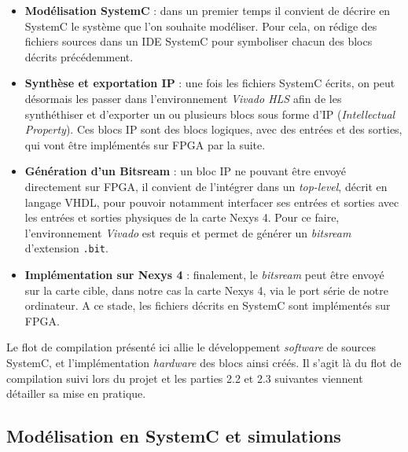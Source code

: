 \documentclass[a4paper,12pt]{article}
\begin{document}
	\begin{itemize}
		\item[\textbullet] \textbf{Modélisation SystemC} : dans un premier temps il convient de décrire en SystemC le système que l'on souhaite modéliser. Pour cela, on rédige des fichiers sources dans un IDE SystemC pour symboliser chacun des blocs décrits précédemment. \\
		\item[\textbullet] \textbf{Synthèse et exportation IP} : une fois les fichiers SystemC écrits, on peut désormais les passer dans l'environnement \textit{Vivado HLS} afin de les synthéthiser et d'exporter un ou plusieurs blocs sous forme d'IP (\textit{Intellectual Property}). Ces blocs IP sont des blocs logiques, avec des entrées et des sorties, qui vont être implémentés sur FPGA par la suite. \\
		\item[\textbullet] \textbf{Génération d'un Bitsream} : un bloc IP ne pouvant être envoyé directement sur FPGA, il convient de l'intégrer dans un \textit{top-level}, décrit en langage VHDL, pour pouvoir notamment interfacer ses entrées et sorties avec les entrées et sorties physiques de la carte Nexys 4. Pour ce faire, l'environnement \textit{Vivado} est requis et permet de générer un \textit{bitsream} d'extension \texttt{.bit}. \\
		\item[\textbullet] \textbf{Implémentation sur Nexys 4} : finalement, le \textit{bitsream} peut être envoyé sur la carte cible, dans notre cas la carte Nexys 4, via le port série de notre ordinateur. A ce stade, les fichiers décrits en SystemC sont implémentés sur FPGA.\\
	\end{itemize}
	Le flot de compilation présenté ici allie le développement \textit{software} de sources SystemC, et l'implémentation \textit{hardware} des blocs ainsi créés. Il s'agit là du flot de compilation suivi lors du projet et les parties 2.2 et 2.3 suivantes viennent détailler sa mise en pratique.


\subsection{Modélisation en SystemC et simulations}
\end{document}
